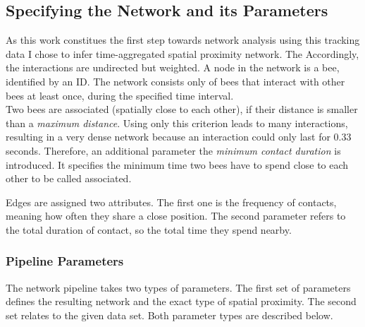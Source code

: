 \subsection{Specifying the Network and its Parameters}
As this work constitues the first step towards network analysis using this tracking data I chose to infer time-aggregated spatial proximity network. The Accordingly, the interactions are undirected but weighted.
A node in the network is a bee, identified by an ID.
The network consists only of bees that interact with other bees at least once, during the specified time interval.\\
Two bees are associated (spatially close to each other), if their distance is smaller than a \emph{maximum distance}.
Using only this criterion leads to many interactions, resulting in a very dense network because an interaction could only last for 0.33 seconds.
Therefore, an additional parameter the \emph{minimum contact duration} is introduced.
It specifies the minimum time two bees have to spend close to each other to be called associated.

Edges are assigned two attributes.
The first one is the frequency of contacts, meaning how often they share a close position. The second parameter refers to the total duration of contact, so the total time they spend nearby.

\subsubsection{Pipeline Parameters}
The network pipeline takes two types of parameters. The first set of parameters defines the resulting network and the exact type of spatial proximity. The second set relates to the given data set. Both parameter types are described below.

